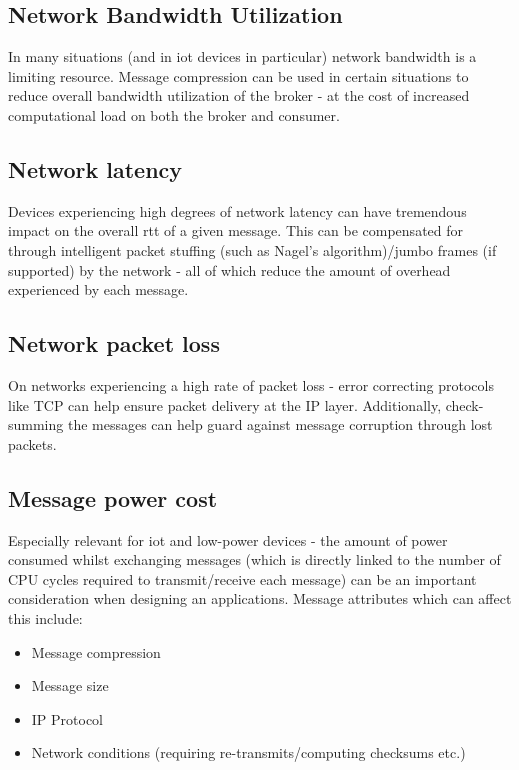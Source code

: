 \subsection{Network Bandwidth Utilization}
\label{sub:Network Bandwidth Utilization}

In many situations (and in \gls{iot} devices in particular) network bandwidth is
a limiting resource. Message compression can be used in certain situations to
reduce overall bandwidth utilization of the broker - at the cost of increased
computational load on both the broker and consumer.

\subsection{Network latency}
\label{sub:Network latency}

Devices experiencing high degrees of network latency can have tremendous impact
on the overall \gls{rtt} of a given message. This can be compensated for through
intelligent packet stuffing (such as Nagel's algorithm)/jumbo frames (if supported)
by the network - all of which reduce the amount of overhead experienced by each
message.

\subsection{Network packet loss}
\label{sub:Network packet loss}

On networks experiencing a high rate of packet loss - error correcting protocols
like TCP can help ensure packet delivery at the IP layer. Additionally,
check-summing the messages can help guard against message corruption through lost
packets.

\subsection{Message power cost}
\label{sub:Message power cost}

Especially relevant for \gls{iot} and low-power devices - the amount of power
consumed whilst exchanging messages (which is directly linked to the number of
CPU cycles required to transmit/receive each message) can be an important
consideration when designing an applications. Message attributes which can
affect this include:

\begin{itemize}
  \item Message compression
  \item Message size
  \item IP Protocol
  \item Network conditions (requiring re-transmits/computing checksums etc.)
\end{itemize}

